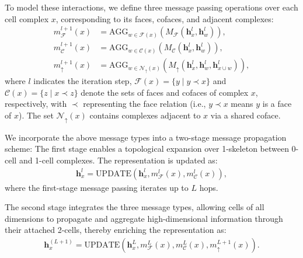 To model these interactions, we define three message passing operations over each cell complex $x$, corresponding to its faces, cofaces, and adjacent complexes:
\begin{equation}
    \begin{split}
m_{\mathcal{F}}^{l+1}(x) &= \text{AGG}_{w \in \mathcal{F}(x)}\left( M_{\mathcal{F}}\left( \bm{h}_x^{l}, \bm{h}_w^{l} \right) \right), \\
m_{\mathcal{C}}^{l+1}(x) &= \text{AGG}_{w \in \mathcal{C}(x)}\left( M_{\mathcal{C}}\left( \bm{h}_x^{l}, \bm{h}_w^{l} \right) \right), \\
m_{\uparrow}^{l+1}(x) &= \text{AGG}_{w \in \mathcal{N}_{\uparrow}(x)}\left( M_{\uparrow}\left( \bm{h}_x^l, \bm{h}_w^l, \bm{h}_{x \cup w}^{l} \right) \right),
\end{split}
\end{equation}
where \(l\) indicates the iteration step, \(\mathcal{F}(x) = \{ y \mid y \prec x \}\) and \(\mathcal{C}(x) = \{ z \mid x \prec z \}\) denote the sets of faces and cofaces of complex \(x\), respectively, with \(\prec\) representing the face relation (i.e., \(y \prec x\) means \(y\) is a face of \(x\)). The set \(\mathcal{N}_{\uparrow}(x)\) contains complexes adjacent to \(x\) via a shared coface.

We incorporate the above message types into a two-stage message propagation scheme: 
The first stage enables a topological expansion over 1-skeleton between 0-cell and 1-cell complexes. The representation is updated as:
\begin{align}
\bm{h}_x^{l} = \text{UPDATE}\left( \bm{h}_x^{l}, m_{\mathcal{F}}^{l}(x), m_{\mathcal{C}}^{l}(x) \right),
\end{align}
where the first-stage message passing iterates up to \(L\) hops.


The second stage integrates the three message types, allowing cells of all dimensions to propagate and aggregate high-dimensional information through their attached 2-cells, thereby enriching the representation as:
\begin{align}
\bm{h}_x^{(L+1)} = \text{UPDATE}\left( \bm{h}_x^{L}, m_{\mathcal{F}}^{L}(x), m_{\mathcal{C}}^{L}(x), m_{\uparrow}^{L+1}(x) \right).
\end{align}

